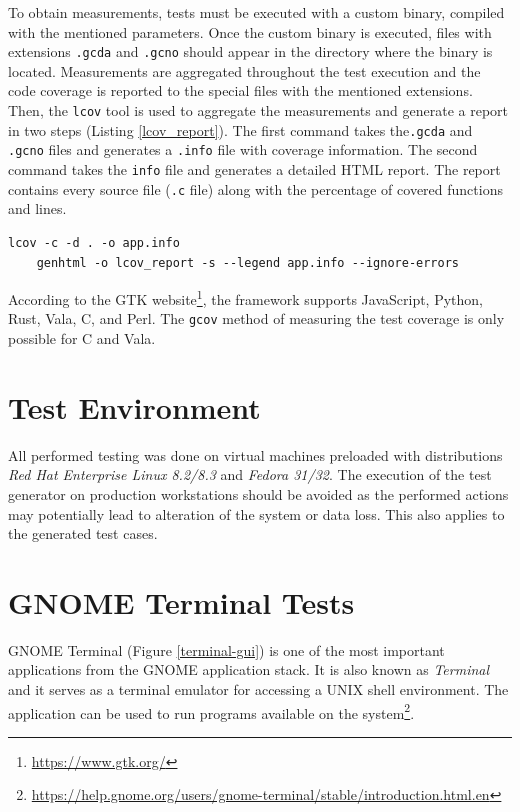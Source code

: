To obtain measurements, tests must be executed with a custom binary, compiled with the mentioned parameters. Once the custom binary is executed, files with extensions \texttt{.gcda} and \texttt{.gcno} should appear in the directory where the binary is located. Measurements are aggregated throughout the test execution and the code coverage is reported to the special files with the mentioned extensions. Then, the \texttt{lcov} tool is used to aggregate the measurements and generate a report in two steps (Listing \ref{lcov_report}). The first command takes the\texttt{.gcda} and \texttt{.gcno} files and generates a \texttt{.info} file with coverage information. The second command takes the \texttt{info} file and generates a detailed HTML report. The report contains every source file (\texttt{.c} file) along with the percentage of covered functions and lines.

\begin{lstlisting}[language=Gherkin,caption={Shell commands used to generate an HTML report with the \texttt{lcov} tool},label={lcov_report}]
    lcov -c -d . -o app.info
    genhtml -o lcov_report -s --legend app.info --ignore-errors
\end{lstlisting}

According to the GTK website\footnote{\url{https://www.gtk.org/}}, the framework supports JavaScript, Python, Rust, Vala, C, and Perl. The \verb|gcov| method of measuring the test coverage is only possible for C and Vala.    
\section{Test Environment}
All performed testing was done on virtual machines preloaded with distributions \textit{Red Hat Enterprise Linux 8.2/8.3} and \textit{Fedora 31/32}. The execution of the test generator on production workstations should be avoided as the performed actions may potentially lead to alteration of the system or data loss.  This also applies to the generated test cases. 

\section{GNOME Terminal Tests}\label{terminal}
GNOME Terminal (Figure \ref{terminal-gui}) is one of the most important applications from the GNOME application stack. It is also known as \textit{Terminal} and it serves as a terminal emulator for accessing a UNIX shell environment. The application can be used to run programs available on the system\footnote{\url{https://help.gnome.org/users/gnome-terminal/stable/introduction.html.en}}. 

